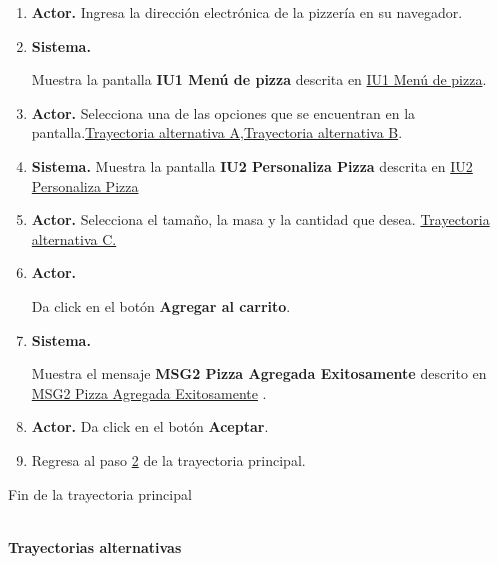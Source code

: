 		\begin{enumerate}
			\item {\textbf{Actor.}} Ingresa la dirección electrónica de la pizzería en su navegador.
			
			\item \hypertarget{CU1:TP:P2}{\textbf{Sistema.}} Muestra la pantalla \textbf{IU1 Menú de pizza} descrita en \hyperlink{IU1}{IU1 Menú de pizza}.
			
			\item \textbf{Actor.} Selecciona una de las opciones que se encuentran en la pantalla.\hyperlink{CU1:TAA}{Trayectoria alternativa A},\hyperlink{CU1:TAB}{Trayectoria alternativa B}. 
			
			\item \textbf{Sistema.} Muestra la pantalla  \textbf{IU2 Personaliza Pizza} descrita en \hyperlink{IU2}{IU2 Personaliza Pizza}
			
			\item \textbf{Actor.} Selecciona el tamaño, la masa y la cantidad que desea. \hyperlink{CU1:TAC}{Trayectoria alternativa C.}
			
			\item  \hypertarget{CU1:TP:P6}{\textbf{Actor.}} Da click en el botón \textbf{Agregar al carrito}.
			
			\item \hypertarget{CU1:TP:P7}{\textbf{Sistema.}} Muestra el mensaje \textbf{MSG2 Pizza Agregada Exitosamente} descrito en \hyperlink{MSG2:PizzaAgregada}{MSG2 Pizza Agregada Exitosamente} .
			
			\item \textbf{Actor.} Da click en el botón \textbf{Aceptar}. 
			
			\item Regresa al paso \hyperlink{CU1:TP:P2}{2} de la trayectoria principal. 
			
			
		\end{enumerate}	
		Fin de la trayectoria principal

	\noindent \textbf{\\Trayectorias alternativas}

